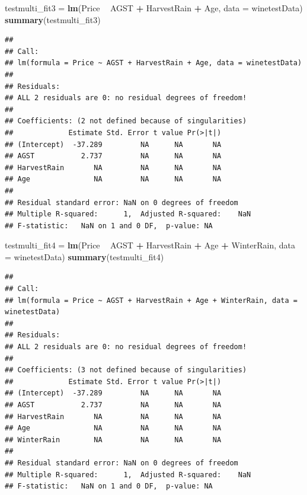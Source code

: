 \documentclass[
]{article}
\newenvironment{Shaded}{\begin{snugshade}}{\end{snugshade}}
\newcommand{\DataTypeTok}[1]{\textcolor[rgb]{0.13,0.29,0.53}{#1}}
\newcommand{\KeywordTok}[1]{\textcolor[rgb]{0.13,0.29,0.53}{\textbf{#1}}}
\newcommand{\NormalTok}[1]{#1}
\newcommand{\OperatorTok}[1]{\textcolor[rgb]{0.81,0.36,0.00}{\textbf{#1}}}
\newcommand{\StringTok}[1]{\textcolor[rgb]{0.31,0.60,0.02}{#1}}
\begin{document}
\begin{Shaded}
\begin{Highlighting}[]
\NormalTok{testmulti_fit3 =}\StringTok{ }\KeywordTok{lm}\NormalTok{(Price }\OperatorTok{~}\StringTok{ }\NormalTok{AGST }\OperatorTok{+}\StringTok{ }\NormalTok{HarvestRain }\OperatorTok{+}\StringTok{ }\NormalTok{Age, }\DataTypeTok{data =}\NormalTok{ winetestData)}
\KeywordTok{summary}\NormalTok{(testmulti_fit3)}
\end{Highlighting}
\end{Shaded}

\begin{verbatim}
## 
## Call:
## lm(formula = Price ~ AGST + HarvestRain + Age, data = winetestData)
## 
## Residuals:
## ALL 2 residuals are 0: no residual degrees of freedom!
## 
## Coefficients: (2 not defined because of singularities)
##             Estimate Std. Error t value Pr(>|t|)
## (Intercept)  -37.289         NA      NA       NA
## AGST           2.737         NA      NA       NA
## HarvestRain       NA         NA      NA       NA
## Age               NA         NA      NA       NA
## 
## Residual standard error: NaN on 0 degrees of freedom
## Multiple R-squared:      1,  Adjusted R-squared:    NaN 
## F-statistic:   NaN on 1 and 0 DF,  p-value: NA
\end{verbatim}

\begin{Shaded}
\begin{Highlighting}[]
\NormalTok{testmulti_fit4 =}\StringTok{ }\KeywordTok{lm}\NormalTok{(Price }\OperatorTok{~}\StringTok{ }\NormalTok{AGST }\OperatorTok{+}\StringTok{ }\NormalTok{HarvestRain }\OperatorTok{+}\StringTok{ }\NormalTok{Age }\OperatorTok{+}\StringTok{ }\NormalTok{WinterRain, }\DataTypeTok{data =}\NormalTok{ winetestData)}
\KeywordTok{summary}\NormalTok{(testmulti_fit4)}
\end{Highlighting}
\end{Shaded}

\begin{verbatim}
## 
## Call:
## lm(formula = Price ~ AGST + HarvestRain + Age + WinterRain, data = winetestData)
## 
## Residuals:
## ALL 2 residuals are 0: no residual degrees of freedom!
## 
## Coefficients: (3 not defined because of singularities)
##             Estimate Std. Error t value Pr(>|t|)
## (Intercept)  -37.289         NA      NA       NA
## AGST           2.737         NA      NA       NA
## HarvestRain       NA         NA      NA       NA
## Age               NA         NA      NA       NA
## WinterRain        NA         NA      NA       NA
## 
## Residual standard error: NaN on 0 degrees of freedom
## Multiple R-squared:      1,  Adjusted R-squared:    NaN 
## F-statistic:   NaN on 1 and 0 DF,  p-value: NA
\end{verbatim}
\end{document}
